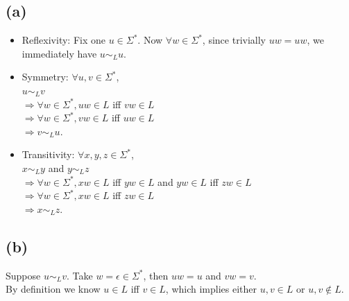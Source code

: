 \documentclass{article}
\begin{document}
        \subsection*{(a)}
            \begin{itemize}
                \item Reflexivity: Fix one $u \in \Sigma^*$. Now $\forall w \in \Sigma^*$,
                since trivially $uw = uw$, we immediately have $u \sim_L u$.
                
                \item Symmetry: $\forall u, v \in \Sigma^*$, \\
                $u \sim_L v$ \\
                $\Longrightarrow \forall w \in \Sigma^*, uw \in L$ iff $vw \in L$ \\
                $\Longrightarrow \forall w \in \Sigma^*, vw \in L$ iff $uw \in L$ \\
                $\Longrightarrow v \sim_L u$.
                
                \item Transitivity: $\forall x, y, z \in \Sigma^*$, \\
                $x \sim_L y$ and $y \sim_L z$ \\
                $\Longrightarrow \forall w \in \Sigma^*, xw \in L$ iff $yw \in L$ and $yw \in L$ iff $zw \in L$ \\
                $\Longrightarrow \forall w \in \Sigma^*, xw \in L$ iff $zw \in L$ \\
                $\Longrightarrow x \sim_L z$.
            \end{itemize}
        
        \subsection*{(b)}
            Suppose $u \sim_L v$.
            Take $w = \epsilon \in \Sigma^*$,
            then $uw = u$ and $vw = v$. \\
            By definition we know $u \in L$ iff $v \in L$,
            which implies either $u, v \in L$ or $u, v \notin L$.
        
\end{document}
